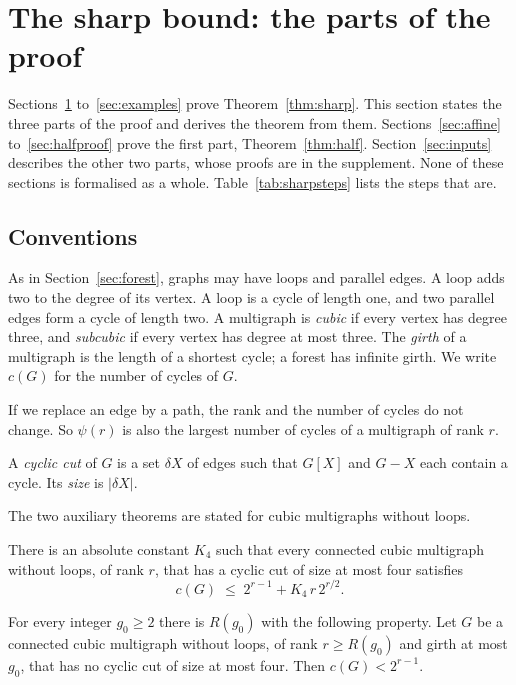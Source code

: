 \section{The sharp bound: the parts of the proof}\label{sec:sharp}

Sections~\ref{sec:sharp} to~\ref{sec:examples} prove Theorem~\ref{thm:sharp}. This section states
the three parts of the proof and derives the theorem from them. Sections~\ref{sec:affine}
to~\ref{sec:halfproof} prove the first part, Theorem~\ref{thm:half}. Section~\ref{sec:inputs}
describes the other two parts, whose proofs are in the supplement. None of these sections is
formalised as a whole. Table~\ref{tab:sharpsteps} lists the steps that are.

\subsection{Conventions}

As in Section~\ref{sec:forest}, graphs may have loops and parallel edges. A loop adds two to the
degree of its vertex. A loop is a cycle of length one, and two parallel edges form a cycle of
length two. A multigraph is \emph{cubic} if every vertex has degree three, and \emph{subcubic} if
every vertex has degree at most three. The \emph{girth} of a multigraph is the length of a shortest
cycle; a forest has infinite girth. We write $c(G)$ for the number of cycles of $G$.

If we replace an edge by a path, the rank and the number of cycles do not change. So $\psi(r)$ is
also the largest number of cycles of a multigraph of rank $r$.

A \emph{cyclic cut} of $G$ is a set $\delta X$ of edges such that $G[X]$ and $G-X$ each contain a
cycle. Its \emph{size} is $|\delta X|$.

The two auxiliary theorems are stated for cubic multigraphs without loops.

\begin{theorem}\label{thm:smallcut}
There is an absolute constant $K_4$ such that every connected cubic multigraph without loops, of
rank $r$, that has a cyclic cut of size at most four satisfies
\[
  c(G)\;\le\;2^{r-1}+K_4\,r\,2^{r/2}.
\]
\end{theorem}

\begin{theorem}\label{thm:girth}
For every integer $g_0\ge2$ there is $R(g_0)$ with the following property. Let $G$ be a connected
cubic multigraph without loops, of rank $r\ge R(g_0)$ and girth at most $g_0$, that has no cyclic
cut of size at most four. Then $c(G)<2^{r-1}$.
\end{theorem}

